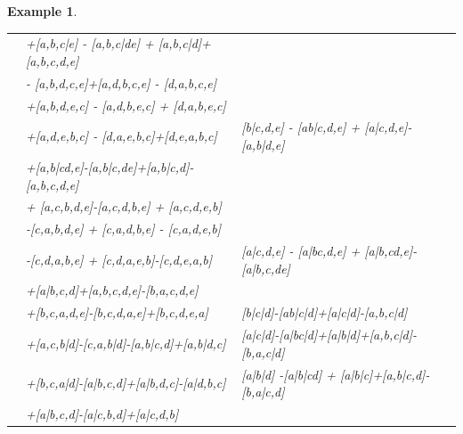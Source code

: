 \documentclass[pdftex]{sigma}
\numberwithin{equation}{section}
\newtheorem{Example}[Theorem]{Example}
\begin{document}
\begin{Example}
\begin{longtable}{llll}
\begin{aligned}[t]
 &{}+[a,b,c|e] - [a,b,c|de] + [a,b,c|d]+[a,b,c,d,e] \\
 &{}- [a,b,d,c,e]+[a,d,b,c,e] - [d,a,b,c,e]\\
 &{}+[a,b,d,e,c] - [a,d,b,e,c] + [d,a,b,e,c]\\
 &{}+[a,d,e,b,c] - [d,a,e,b,c]+[d,e,a,b,c]
 \end{aligned}$\\
\midrule[0.5pt]
 & & $[a,b|c,d,e]$ &
		 $\!\begin{aligned}[t]
 \partial[a,b|c,d,e] ={}& [b|c,d,e] - [ab|c,d,e] + [a|c,d,e]-[a,b|d,e] \\
 &{}+[a,b|cd,e]-[a,b|c,de]+[a,b|c,d]-[a,b,c,d,e] \\
 &{} + [a,c,b,d,e]-[a,c,d,b,e] + [a,c,d,e,b]\\
 &{}-[c,a,b,d,e] + [c,a,d,b,e] - [c,a,d,e,b]\\
 &{}-[c,d,a,b,e] + [c,d,a,e,b]-[c,d,e,a,b]
 \end{aligned}$\\
\midrule[0.5pt]
 & & $[a|b,c,d,e]$ &
		 $\!\begin{aligned}[t]
 \partial[a|b,c,d,e] ={}& [a|c,d,e] - [a|bc,d,e] + [a|b,cd,e]-[a|b,c,de]\\
 &{}+[a|b,c,d]+[a,b,c,d,e]-[b,a,c,d,e]\\
 &{}+[b,c,a,d,e]-[b,c,d,a,e]+[b,c,d,e,a]
 \end{aligned}$\\
\midrule[0.5pt]
 & & $[a,b|c|d]$ &
		 $\!\begin{aligned}[t]
 \partial[a,b|c|d] ={}& [b|c|d]-[ab|c|d]+[a|c|d]-[a,b,c|d]\\
 &{}+[a,c,b|d]-[c,a,b|d]-[a,b|c,d]+[a,b|d,c]
 \end{aligned}$\\
\midrule[0.5pt]
 & & $[a|b,c|d]$ &
		 $\!\begin{aligned}[t]
 \partial[a|b,c|d] ={}& [a|c|d]-[a|bc|d]+[a|b|d]+[a,b,c|d]-[b,a,c|d]\\
 &{}+[b,c,a|d]-[a|b,c,d]+[a|b,d,c]-[a|d,b,c]
 \end{aligned}$\\
\midrule[0.5pt]
 & & $[a|b|c,d]$ &
		 $\!\begin{aligned}[t]
 \partial[a|b|c,d] ={}& [a|b|d] -[a|b|cd] + [a|b|c]+[a,b|c,d]-[b,a|c,d] \\
 &{}+[a|b,c,d]-[a|c,b,d]+[a|c,d,b]
 \end{aligned}$\\
\midrule[1pt]
 & 2 & $[a,b,c||d]$ &
		 $\!\begin{aligned}[t]

\end{aligned}
\end{longtable}
\end{Example}
\end{document}
